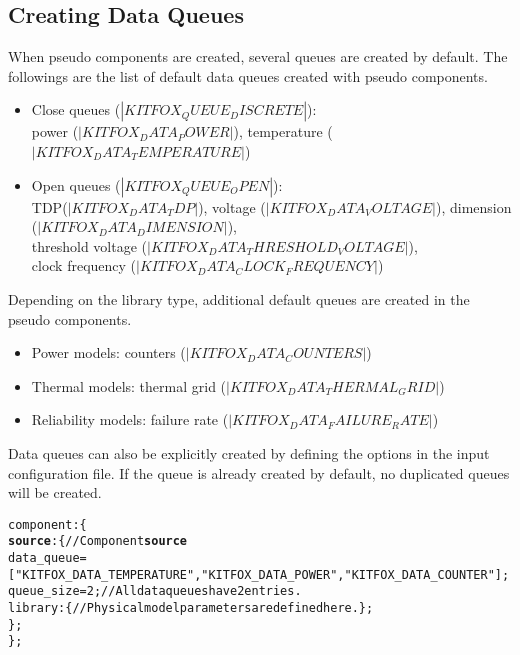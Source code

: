 \subsection{Creating Data Queues} \label{subsec:creating_data_queues}
\noindent
When pseudo components are created, several queues are created by default. The followings are the list of default data queues created with pseudo components.

\begin{itemize}
\item{Close queues ($|KITFOX_QUEUE_DISCRETE|$):\\
power ($|KITFOX_DATA_POWER|$), temperature ($|KITFOX_DATA_TEMPERATURE|$)} \vspace*{-5pt}\leavevmode
\item{Open queues ($|KITFOX_QUEUE_OPEN|$):\\
TDP($|KITFOX_DATA_TDP|$), voltage ($|KITFOX_DATA_VOLTAGE|$), dimension ($|KITFOX_DATA_DIMENSION|$),\\
threshold voltage ($|KITFOX_DATA_THRESHOLD_VOLTAGE|$),\\
clock frequency ($|KITFOX_DATA_CLOCK_FREQUENCY|$)}
\end{itemize}

\noindent
Depending on the library type, additional default queues are created in the pseudo components.

\begin{itemize}
\item{Power models: counters ($|KITFOX_DATA_COUNTERS|$)} \vspace*{-5pt}\leavevmode
\item{Thermal models: thermal grid ($|KITFOX_DATA_THERMAL_GRID|$)} \vspace*{-5pt}\leavevmode
\item{Reliability models: failure rate ($|KITFOX_DATA_FAILURE_RATE|$)}
\end{itemize}

\noindent
Data queues can also be explicitly created by defining the options in the input configuration file. 
If the queue is already created by default, no duplicated queues will be created.
{
\fontsize{10pt}{11pt}\selectfont
\begin{alltt}
component: \{
   {\bf source}: \{ // Component {\bf source}
        data_queue = ["KITFOX_DATA_TEMPERATURE", "KITFOX_DATA_POWER", "KITFOX_DATA_COUNTER"];
        queue_size = 2; // All data queues have 2 entries.
        library: \{ // Physical model parameters are defined here. \};
    \};
\};
\end{alltt}
}

